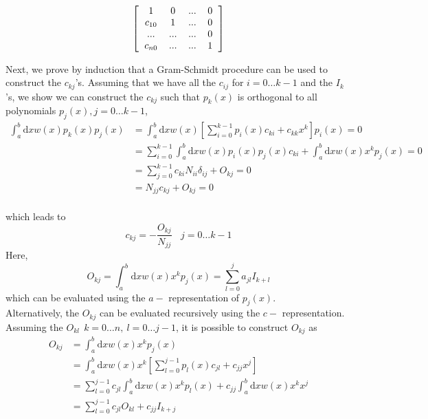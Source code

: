 \documentclass[paper=a4, fontsize=11pt]{article} %
\numberwithin{equation}{section} %
\numberwithin{figure}{section} %
\numberwithin{table}{section} %
\newcommand{\rd}{{\mathrm{d}}}
\begin{document}
\[ 
\left [
  \begin{tabular}{cccc}
  $1$ & $0$ & ... & $0$ \\
  $c_{10}$ & 1 & ... & $0$ \\
  ... & ... & ... & $0$\\
  $c_{n0}$ & ... & ... & $1$\\
  \end{tabular}
\right ]
\]

Next, we prove by induction that a Gram-Schmidt procedure can be used to construct the $c_{kj}$'s. Assuming that we have all the $c_{ij}$ for $i = 0\ldots k-1$ and the $I_{k}$'s, we show we can construct the $c_{kj}$ such that $p_k(x)$ is orthogonal to all polynomials $p_j(x), j = 0\ldots k-1$,
\begin{equation}
\begin{split}
\int_a^b \rd x w(x) p_k(x) p_j(x) 
&= \int_a^b \rd x w(x) \left[\sum_{i=0}^{k-1} p_{i}(x) c_{ki} + c_{kk} x^k\right] p_i(x) =0 \\
&= \sum_{i=0}^{k-1} \int_a^b \rd x w(x) p_{i}(x) p_j(x) c_{ki} + \int_a^b \rd x w(x) x^k p_j(x)=0 \\
&= \sum_{j=0}^{k-1} c_{ki} N_{ii} \delta_{ij} + O_{kj}=0\\
&= N_{jj} c_{kj} + O_{kj}=0\\
\end{split}
\end{equation}

which leads to
\begin{equation}
c_{kj} = -\frac{O_{kj}}{N_{jj}}\ \ \ \
j = 0\ldots k-1
\end{equation}
Here,
\begin{equation} 
O_{kj} = \int_a^b \rd x w(x) x^k p_j(x) = \sum_{l=0}^j a_{jl} I_{k+l}
\end{equation}
which can be evaluated using the $a-$ representation of $p_j(x)$. \\

Alternatively, the $O_{kj}$ can be evaluated recursively using the $c-$ representation. Assuming the $O_{kl}\ \ k = 0 \ldots n, \ l = 0 \ldots j-1$, it is possible to construct $O_{kj}$ as
\begin{equation}
\begin{split}
O_{kj} &= \int_a^b \rd x w(x) x^k p_j(x) \\
&= \int_a^b \rd x w(x) x^k  \left[\sum_{l=0}^{j-1} p_{l}(x) c_{jl} + c_{jj} x^j\right]\\
&= \sum_{l=0}^{j-1} c_{jl} \int_a^b \rd x w(x) x^k p_{l}(x) + c_{jj}\int_a^b \rd x w(x) x^k x^j \\
&= \sum_{l=0}^{j-1} c_{jl}O_{kl} + c_{jj} I_{k+j}
\end{split}
\end{equation}
\end{document}
